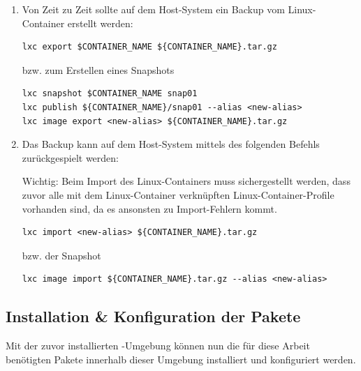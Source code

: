 \begin{enumerate}[label*=\arabic*.]
    \item Von Zeit zu Zeit sollte auf dem Host-System ein Backup vom Linux-Container erstellt werden:
        \begin{lstlisting}[style=bash]
lxc export $CONTAINER_NAME ${CONTAINER_NAME}.tar.gz
        \end{lstlisting}

        bzw. zum Erstellen eines Snapshots

        \begin{lstlisting}[style=bash]
lxc snapshot $CONTAINER_NAME snap01
lxc publish ${CONTAINER_NAME}/snap01 --alias <new-alias>
lxc image export <new-alias> ${CONTAINER_NAME}.tar.gz
        \end{lstlisting}

    \item Das Backup kann auf dem Host-System mittels des folgenden Befehls zurückgespielt werden:
        \begin{redbox}{Wichtig:}
            Beim Import des Linux-Containers muss sichergestellt werden, dass zuvor alle mit dem Linux-Container verknüpften Linux-Container-Profile vorhanden sind, da es ansonsten zu Import-Fehlern kommt.
        \end{redbox}

        \begin{lstlisting}[style=bash]
lxc import <new-alias> ${CONTAINER_NAME}.tar.gz
        \end{lstlisting}

        bzw. der Snapshot

        \begin{lstlisting}[style=bash]
lxc image import ${CONTAINER_NAME}.tar.gz --alias <new-alias>
        \end{lstlisting}
\end{enumerate}


\subsection{Installation \& Konfiguration der Pakete}
Mit der zuvor installierten -Umgebung können nun die für diese Arbeit benötigten Pakete innerhalb dieser Umgebung installiert und konfiguriert werden.

